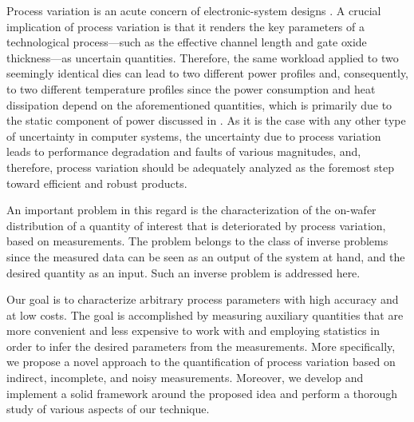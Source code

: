 Process variation is an acute concern of electronic-system designs
\cite{chandrakasan2000, srivastava2010}. A crucial implication of process
variation is that it renders the key parameters of a technological
process---such as the effective channel length and gate oxide thickness---as
uncertain quantities. Therefore, the same workload applied to two seemingly
identical dies can lead to two different power profiles and, consequently, to
two different temperature profiles since the power consumption and heat
dissipation depend on the aforementioned quantities, which is primarily due to
the static component of power discussed in . As it is the
case with any other type of uncertainty in computer systems, the uncertainty due
to process variation leads to performance degradation and faults of various
magnitudes, and, therefore, process variation should be adequately analyzed as
the foremost step toward efficient and robust products.

An important problem in this regard is the characterization of the on-wafer
distribution of a quantity of interest that is deteriorated by process
variation, based on measurements. The problem belongs to the class of inverse
problems since the measured data can be seen as an output of the system at hand,
and the desired quantity as an input. Such an inverse problem is addressed here.

Our goal is to characterize arbitrary process parameters with high accuracy and
at low costs. The goal is accomplished by measuring auxiliary quantities that
are more convenient and less expensive to work with and employing statistics in
order to infer the desired parameters from the measurements. More specifically,
we propose a novel approach to the quantification of process variation based on
indirect, incomplete, and noisy measurements. Moreover, we develop and implement
a solid framework around the proposed idea and perform a thorough study of
various aspects of our technique.

